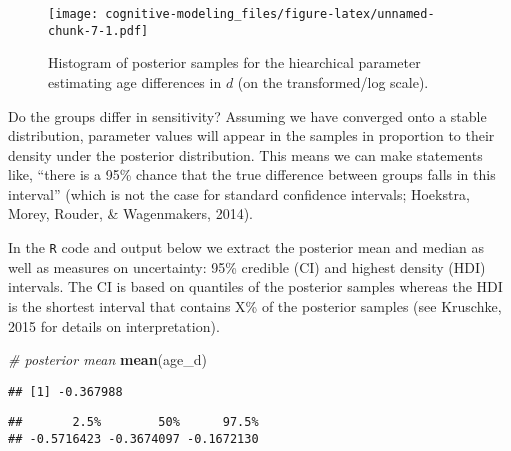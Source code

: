 \documentclass[
  english,
  ,man,floatsintext]{apa6}
\newenvironment{Shaded}{\begin{snugshade}}{\end{snugshade}}
\newcommand{\CommentTok}[1]{\textcolor[rgb]{0.56,0.35,0.01}{\textit{#1}}}
\newcommand{\DataTypeTok}[1]{\textcolor[rgb]{0.13,0.29,0.53}{#1}}
\newcommand{\FloatTok}[1]{\textcolor[rgb]{0.00,0.00,0.81}{#1}}
\newcommand{\KeywordTok}[1]{\textcolor[rgb]{0.13,0.29,0.53}{\textbf{#1}}}
\newcommand{\NormalTok}[1]{#1}
\begin{document}
\begin{figure}
\centering
\texttt{[image: cognitive-modeling\_files/figure-latex/unnamed-chunk-7-1.pdf]}
\caption{\label{fig:unnamed-chunk-7}Histogram of posterior samples for the hiearchical parameter estimating age differences in \(d\) (on the transformed/log scale).}
\end{figure}

Do the groups differ in sensitivity? Assuming we have converged onto a stable distribution, parameter values will appear in the samples in proportion to their density under the posterior distribution. This means we can make statements like, \enquote{there is a 95\% chance that the true difference between groups falls in this interval} (which is not the case for standard confidence intervals; Hoekstra, Morey, Rouder, \& Wagenmakers, 2014).

In the \texttt{R} code and output below we extract the posterior mean and median as well as measures on uncertainty: 95\% credible (CI) and highest density (HDI) intervals. The CI is based on quantiles of the posterior samples whereas the HDI is the shortest interval that contains X\% of the posterior samples (see Kruschke, 2015 for details on interpretation).

\begin{Shaded}
\begin{Highlighting}[]
\CommentTok{# posterior mean}
\KeywordTok{mean}\NormalTok{(age_d)}
\end{Highlighting}
\end{Shaded}

\begin{verbatim}
## [1] -0.367988
\end{verbatim}

\begin{Shaded}
\end{Shaded}

\begin{verbatim}
##       2.5%        50%      97.5% 
## -0.5716423 -0.3674097 -0.1672130
\end{verbatim}

\begin{Shaded}
\end{Shaded}
\end{document}
